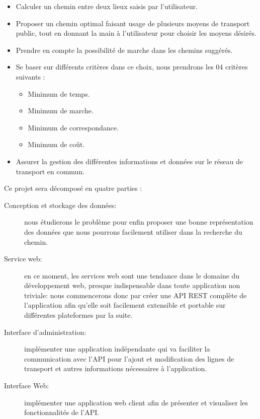 \begin{itemize}
	\item Calculer un chemin entre deux lieux saisis par l'utilisateur.
	\item Proposer un chemin optimal faisant usage de plusieurs moyens de transport public, tout en donnant la main à l'utilisateur pour choisir les moyens désirés.
	\item Prendre en compte la possibilité de marche dans les chemins suggérés.
	\item Se baser sur différents critères dans ce choix, nous prendrons les 04 critères suivants : 
	\begin{itemize}
		\item Minimum de temps.
		\item Minimum de marche.
		\item Minimum de correspondance.
		\item Minimum de coût.
	\end{itemize}	 
	\item Assurer la gestion des différentes informations et données sur le réseau de transport en commun.\\
\end{itemize}
Ce projet sera décomposé en quatre parties :
\begin{description}
	\item[Conception et stockage des données:] nous étudierons le problème pour enfin proposer une bonne représentation des données que nous pourrons facilement utiliser dans la recherche du chemin.

	\item[Service web:] en ce moment, les services web sont une tendance dans le domaine du développement web, presque indispensable dans toute application non triviale: nous commencerons donc par créer une API REST complète de l'application afin qu'elle soit facilement extensible et portable sur différentes plateformes par la suite.
	
	\item[Interface d'administration:] implémenter une application indépendante qui va faciliter la  communication avec l'API pour l'ajout et modification des lignes de transport et autres informations nécessaires à l'application.
	
	
	\item[Interface Web:] implémenter une application web client afin de présenter et visualiser les fonctionnalités de l'API.
\end{description}

